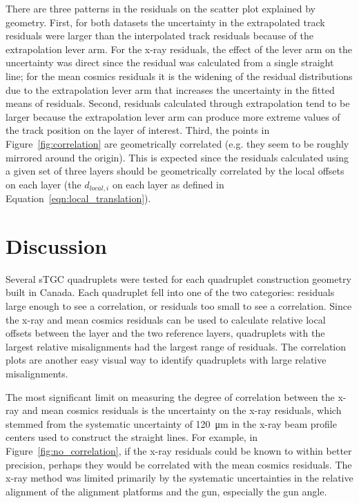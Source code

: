 There are three patterns in the residuals on the scatter plot explained by geometry. First, for both datasets the uncertainty in the extrapolated track residuals were larger than the interpolated track residuals because of the extrapolation lever arm. For the x-ray residuals, the effect of the lever arm on the uncertainty was direct since the residual was calculated from a single straight line; for the mean cosmics residuals it is the widening of the residual distributions due to the extrapolation lever arm that increases the uncertainty in the fitted means of residuals. Second, residuals calculated through extrapolation tend to be larger because the extrapolation lever arm can produce more extreme values of the track position on the layer of interest. Third, the points in Figure~\ref{fig:correlation} are geometrically correlated (e.g. they seem to be roughly mirrored around the origin). This is expected since the residuals calculated using a given set of three layers should be geometrically correlated by the local offsets on each layer (the $d_{local, i}$ on each layer as defined in Equation~\ref{eqn:local_translation}). 

\section{Discussion}

Several sTGC quadruplets were tested for each quadruplet construction geometry built in Canada. Each quadruplet fell into one of the two categories: residuals large enough to see a correlation, or residuals too small to see a correlation. Since the x-ray and mean cosmics residuals can be used to calculate relative local offsets between the layer and the two reference layers, quadruplets with the largest relative misalignments had the largest range of residuals. The correlation plots are another easy visual way to identify quadruplets with large relative misalignments.

The most significant limit on measuring the degree of correlation between the x-ray and mean cosmics residuals is the uncertainty on the x-ray residuals, which stemmed from the systematic uncertainty of \SI{120}{\micro\meter} in the x-ray beam profile centers used to construct the straight lines. For example, in Figure~\ref{fig:no_correlation}, if the x-ray residuals could be known to within better precision, perhaps they would be correlated with the mean cosmics residuals. The x-ray method was limited primarily by the systematic uncertainties in the relative alignment of the alignment platforms and the gun, especially the gun angle.

